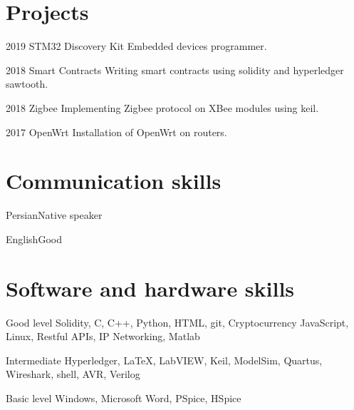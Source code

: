 \documentclass{tccv}
\begin{document}
\section{Projects}

\begin{yearlist}

\item{2019}
     {STM32 Discovery Kit}
     {Embedded devices programmer.}

\item{2018}
     {Smart Contracts}
     {Writing smart contracts using solidity and hyperledger sawtooth.}

\item{2018}
     {Zigbee}
     {Implementing Zigbee protocol on XBee modules using keil.}

\item{2017}
     {OpenWrt}
     {Installation of OpenWrt on routers.}

\end{yearlist}

\section{Communication skills}

\begin{factlist}
\item{Persian}{Native speaker}
\item{English}{Good}
\end{factlist}

\section{Software and hardware skills}

\begin{factlist}

\item{Good level}
     {Solidity, C, C++, Python, HTML, git, Cryptocurrency
      JavaScript, Linux, Restful APIs, IP Networking, Matlab}

\item{Intermediate}
     {Hyperledger, \LaTeX, LabVIEW, Keil, ModelSim, Quartus,
     Wireshark, shell, AVR, Verilog}

\item{Basic level}
     {Windows, Microsoft Word, PSpice, HSpice}

\end{factlist}
\end{document}
